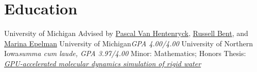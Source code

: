 \section{Education}
		{University of Michigan}{}{}
		{Advised by \href{http://pascalvanhentenryck.engin.umich.edu/}{Pascal Van Hentenryck}, \href{http://public.lanl.gov/rbent/}{Russell Bent}, and \href{http://www-personal.umich.edu/~mepelman/}{Marina Epelman}}
		{University of Michigan}{}{\textit{GPA 4.00/4.00}}
		{}
		{University of Northern Iowa}{}{\textit{summa cum laude, GPA 3.97/4.00}}
		{Minor: Mathematics; Honors Thesis: \href{http://byron.tasseff.com/documents/reports/2012-gpu_accelerated_molecular_dynamics_simulation_of_rigid_water.pdf}{\textit{GPU-accelerated molecular dynamics simulation of rigid water}}}
